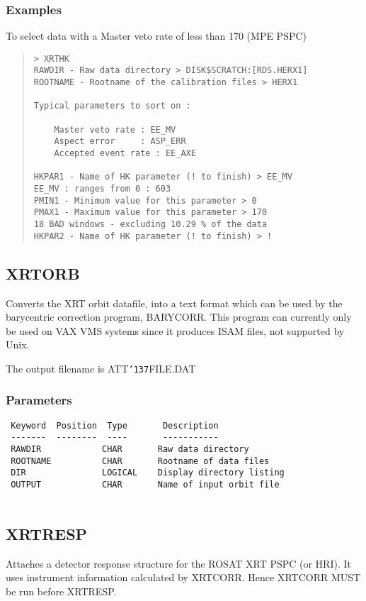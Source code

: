 \documentclass{book}
\renewcommand{\_}{{\tt\char'137}}     %
\begin{document}
\subsubsection{Examples}
To select data with a Master veto rate of less than 170 (MPE PSPC)
\begin{quote}\begin{verbatim}
> XRTHK
RAWDIR - Raw data directory > DISK$SCRATCH:[RDS.HERX1]
ROOTNAME - Rootname of the calibration files > HERX1

Typical parameters to sort on :

    Master veto rate : EE_MV
    Aspect error     : ASP_ERR
    Accepted event rate : EE_AXE

HKPAR1 - Name of HK parameter (! to finish) > EE_MV
EE_MV : ranges from 0 : 603
PMIN1 - Minimum value for this parameter > 0
PMAX1 - Maximum value for this parameter > 170
18 BAD windows - excluding 10.29 % of the data
HKPAR2 - Name of HK parameter (! to finish) > !
\end{verbatim}\end{quote}
\subsection{XRTORB}
Converts the XRT orbit datafile, into a text format
which can be used by the barycentric correction program, BARYCORR.
This program can currently only be used on VAX VMS systems since
it produces ISAM files, not supported by Unix.

The output filename is ATT\_FILE.DAT

\subsubsection{Parameters}
\begin{verbatim}
 Keyword  Position  Type       Description
 -------  --------  ----       -----------
 RAWDIR            CHAR       Raw data directory
 ROOTNAME          CHAR       Rootname of data files
 DIR               LOGICAL    Display directory listing
 OUTPUT            CHAR       Name of input orbit file


\end{verbatim}\subsection{XRTRESP}
Attaches a detector response structure for the ROSAT XRT
PSPC (or HRI). It uses instrument information calculated by
XRTCORR. Hence XRTCORR MUST be run before XRTRESP.
\end{document}

